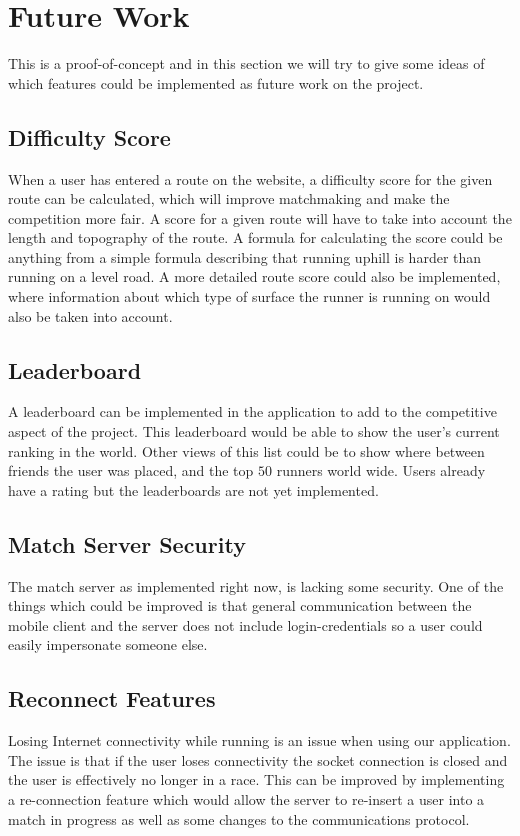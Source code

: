 \section{Future Work}
This is a proof-of-concept and in this section we will try to give some ideas of which features could be implemented as future work on the project.

\subsection{Difficulty Score}
When a user has entered a route on the website, a difficulty score for the given route can be calculated, which will improve matchmaking and make the competition more fair.
A score for a given route will have to take into account the length and topography of the route. A formula for calculating the score could be anything from a simple formula describing that running uphill is harder than running on a level road. A more detailed route score could also be implemented, where information about which type of surface the runner is running on would also be taken into account.

\subsection{Leaderboard}
A leaderboard can be implemented in the application to add to the competitive aspect of the project. This leaderboard would be able to show the user's current ranking in the world. Other views of this list could be to show where between friends the user was placed, and the top $50$ runners world wide. Users already have a rating but the leaderboards are not yet implemented.

\subsection{Match Server Security}
The match server as implemented right now, is lacking some security. One of the things which could be improved is that general communication between the mobile client and the server does not include login-credentials so a user could easily impersonate someone else.

\subsection{Reconnect Features}
Losing Internet connectivity while running is an issue when using our application. The issue is that if the user loses connectivity the socket connection is closed and the user is effectively no longer in a race. This can be improved by implementing a re-connection feature which would allow the server to re-insert a user into a match in progress as well as some changes to the communications protocol.

